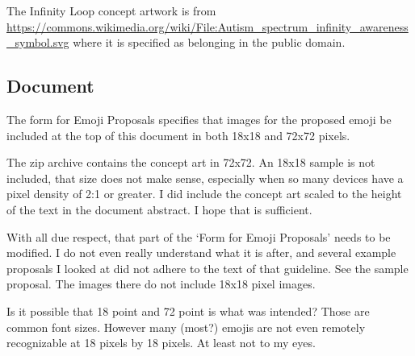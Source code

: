 The Infinity Loop concept artwork is from
\url{https://commons.wikimedia.org/wiki/File:Autism_spectrum_infinity_awareness_symbol.svg}
where it is specified as belonging in the public domain.

\subsection{Document}

The form for Emoji Proposals specifies that images for the proposed emoji be included at
the top of this document in both 18x18 and 72x72 pixels.

The zip archive contains the concept art in 72x72. An 18x18 sample
is not included, that size does not make sense, especially when so many devices have a pixel
density of 2:1 or greater. I did include the concept art scaled to the height of the text
in the document abstract. I hope that is sufficient.

With all due respect, that part of the `Form for Emoji Proposals' needs to be modified. I do
not even really understand what it is after, and several example proposals I looked at did
not adhere to the text of that guideline. See the
sample proposal. The images there do not include 18x18 pixel images.

Is it possible that 18 point and 72 point is what was intended? Those are common font sizes.
However many (most?) emojis are not even remotely recognizable at 18 pixels by 18 pixels. At
least not to my eyes.

